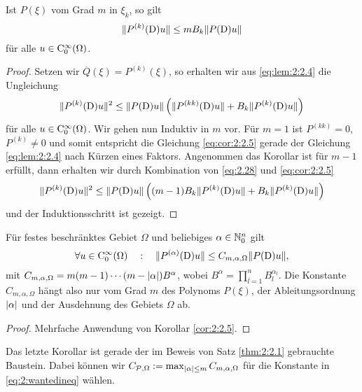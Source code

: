 \begin{cor}\label{cor:2:2.5}
Ist $P(\xi)$ vom Grad $m$ in $\xi_k$, so gilt
\begin{equation}\label{eq:cor:2:2.5}
\lVert P^{(k)}(\mathrm D)u\rVert\leq mB_k\lVert P(\mathrm D)u\rVert
\end{equation}
für alle $u\in\mathrm C_0^\infty(\Omega)$.
\end{cor}
\begin{proof}
Setzen wir $\overline{Q}(\xi)=P^{(k)}(\xi)$, so erhalten wir aus \eqref{eq:lem:2:2.4} die Ungleichung
\begin{equation}\label{eq:2.28}
\lVert P^{(k)}(\mathrm D)u\rVert^2\leq\lVert P(\mathrm D)u\rVert\left(\lVert P^{(kk)}(\mathrm D)u\rVert+B_k\lVert P^{(k)}(\mathrm D)u\rVert\right)
\end{equation}
für alle $u\in\mathrm C_0^\infty(\Omega)$. Wir gehen nun Induktiv in $m$ vor.
Für $m=1$ ist $P^{(kk)}=0$, $P^{(k)}\neq0$ und somit entspricht die Gleichung \eqref{eq:cor:2:2.5}
gerade der Gleichung \eqref{eq:lem:2:2.4} nach Kürzen eines Faktors.
Angenommen das Korollar ist für $m-1$ erfüllt,
dann erhalten wir durch Kombination von \eqref{eq:2.28} und \eqref{eq:cor:2:2.5}
\begin{equation}
\lVert P^{(k)}(\mathrm D)u\rVert^2\leq\lVert P(\mathrm D)u\rVert\left((m-1)B_k\lVert P^{(k)}(\mathrm D)u\rVert+B_k\lVert P^{(k)}(\mathrm D)u\rVert\right)
\end{equation}
und der Induktionsschritt  ist gezeigt.
\end{proof}

\begin{cor}\label{cor:2:2.6}
Für festes beschränktes Gebiet $\Omega$ und beliebiges $\alpha\in\mathbb N^n_0$ gilt
\begin{equation}
\forall u\in\mathrm C_0^\infty(\Omega)\quad:\quad \lVert P^{(\alpha)}(\mathrm D)u\rVert\leq C_{m,\alpha,\Omega}\lVert P(\mathrm D)u\rVert,
\end{equation}
mit $C_{m,\alpha,\Omega}=m(m-1)\cdots(m-\lvert\alpha\rvert)B^\alpha$, wobei $B^\alpha=\prod_{l=1}^n B^{\alpha_l}_l$.
Die Konstante $C_{m,\alpha,\Omega}$ hängt also nur vom Grad $m$ des Polynoms $P(\xi)$,
der Ableitungsordnung $\lvert\alpha\rvert$ und der Ausdehnung des Gebiets $\Omega$ ab.
\end{cor}

\begin{proof}
Mehrfache Anwendung von Korollar \ref{cor:2:2.5}.
\end{proof}

Das letzte Korollar ist gerade der im Beweis
von Satz \ref{thm:2:2.1} gebrauchte Baustein.
Dabei können wir $C_{\mathcal P,\Omega}:=\max_{|\alpha|\le m} C_{m,\alpha,\Omega}$
für die Konstante in \eqref{eq:2:wantedineq} wählen.

